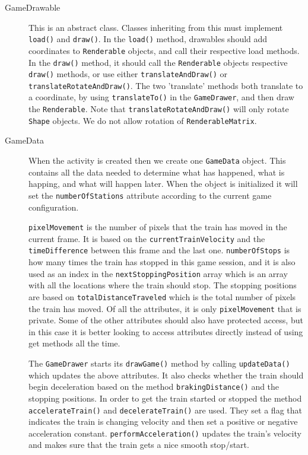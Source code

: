 \begin{description}
\item[GameDrawable] This is an abstract class. Classes inheriting from this must implement \lstinline|load()| and \lstinline|draw()|. In the \lstinline|load()| method, drawables should add coordinates to \lstinline|Renderable| objects, and call their respective load methods. In the \lstinline|draw()| method, it should call the \lstinline|Renderable| objects respective \lstinline|draw()| methods, or use either \lstinline|translateAndDraw()| or \lstinline|translateRotateAndDraw()|. The two 'translate' methods both translate to a coordinate, by using \lstinline|translateTo()| in the \lstinline|GameDrawer|, and then draw the \lstinline|Renderable|. Note that \lstinline|translateRotateAndDraw()| will only rotate \lstinline|Shape| objects. We do not allow rotation of \lstinline|RenderableMatrix|.

\item[GameData] When the activity is created then we create one \lstinline|GameData| object. This contains all the data needed to determine what has happened, what is happing, and what will happen later. When the object is initialized it will set the \lstinline|numberOfStations| attribute according to the current game configuration.

\lstinline|pixelMovement| is the number of pixels that the train has moved in the current frame. It is based on the \lstinline|currentTrainVelocity| and the \lstinline|timeDifference| between this frame and the last one. \lstinline|numberOfStops| is how many times the train has stopped in this game session, and it is also used as an index in the \lstinline|nextStoppingPosition| array which is an array with all the locations where the train should stop. The stopping positions are based on \lstinline|totalDistanceTraveled| which is the total number of pixels the train has moved. Of all the attributes, it is only \lstinline|pixelMovement| that is private. Some of the other attributes should also have protected access, but in this case it is better looking to access attributes directly instead of using get methods all the time.

The \lstinline|GameDrawer| starts its \lstinline|drawGame()| method by calling \lstinline|updateData()| which updates the above attributes. It also checks whether the train should begin deceleration based on the method \lstinline|brakingDistance()| and the stopping positions. In order to get the train started or stopped the method \lstinline|accelerateTrain()| and \lstinline|decelerateTrain()| are used. They set a flag that indicates the train is changing velocity and then set a positive or negative acceleration constant. \lstinline|performAcceleration()| updates the train's velocity and makes sure that the train gets a nice smooth stop/start.


\end{description}
